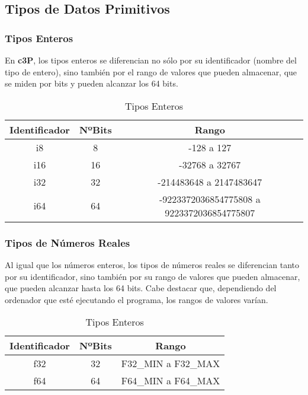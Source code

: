 \subsection{Tipos de Datos Primitivos}
\subsubsection{Tipos Enteros}

En \textbf{c3P}, los tipos enteros se diferencian no sólo por su identificador (nombre del
tipo de entero), sino también por el rango de valores que pueden almacenar, que se miden
por bits y pueden alcanzar los 64 bits.

\begin{table}[H]
    \centering
    \begin{tabular}{|c|c|c|}
         \hline
         \textbf{Identificador} & \textbf{NºBits} & \textbf{Rango} \\
         \hline
         i8 & 8 & -128 a 127 \\
         \hline
         i16 & 16 & -32768 a 32767 \\
         \hline
         i32 & 32 & -214483648 a 2147483647 \\
         \hline
         i64 & 64 & -9223372036854775808 a 9223372036854775807 \\
         \hline
    \end{tabular}
    \caption{Tipos Enteros}
    \label{tab:tab_tipos_enteros}
\end{table}

\subsubsection{Tipos de Números Reales}

Al igual que los números enteros, los tipos de números reales se diferencian tanto
por su identificador, sino también por su rango de valores que pueden almacenar,
que pueden alcanzar hasta los 64 bits. Cabe destacar que, dependiendo del ordenador
que esté ejecutando el programa, los rangos de valores varían.

\begin{table}[H]
    \centering
    \begin{tabular}{|c|c|c|}
         \hline
         \textbf{Identificador} & \textbf{NºBits} & \textbf{Rango} \\
         \hline
         f32 & 32 & F32\_MIN a F32\_MAX \\
         \hline
         f64 & 64 & F64\_MIN a F64\_MAX \\
         \hline
    \end{tabular}
    \caption{Tipos Enteros}
    \label{tab:tab_tipos_decimales}
\end{table}

